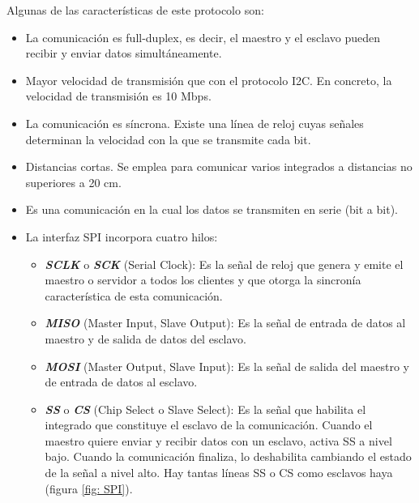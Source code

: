 Algunas de las características de este protocolo son:
\begin{itemize}
    \item La comunicación es full-duplex, es decir, el maestro y el esclavo pueden recibir y enviar datos simultáneamente.
    \item Mayor velocidad de transmisión que con el protocolo I2C. En concreto, la velocidad de transmisión es 10 Mbps.
    \item La comunicación es síncrona. Existe una línea de reloj cuyas señales determinan la velocidad con la que se transmite cada bit. 
    \item Distancias cortas. Se emplea para comunicar varios integrados a distancias no superiores a 20 cm.
    \item Es una comunicación en la cual los datos se transmiten en serie (bit a bit).
    \item La interfaz SPI incorpora cuatro hilos:
        \begin{itemize}
            \item {\itshape\bfseries SCLK} o {\itshape\bfseries SCK} (Serial Clock): Es la señal de reloj que genera y emite el maestro o servidor a todos los clientes y que otorga la sincronía característica de esta comunicación.
            \item {\itshape\bfseries MISO} (Master Input, Slave Output): Es la señal de entrada de datos al maestro y de salida de datos del esclavo.
            \item {\itshape\bfseries MOSI} (Master Output, Slave Input): Es la señal de salida del maestro y de entrada de datos al esclavo.
            \item {\itshape\bfseries SS} o {\itshape\bfseries CS} (Chip Select o Slave Select): Es la señal que habilita el integrado que constituye el esclavo de la comunicación. Cuando el maestro quiere enviar y recibir datos con un esclavo, activa SS a nivel bajo. Cuando la comunicación finaliza, lo deshabilita cambiando el estado de la señal a nivel alto. Hay tantas líneas SS o CS como esclavos haya (figura \ref{fig: SPI}).
        \end{itemize}
\end{itemize}


